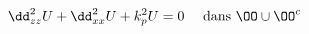 \begin{equation}
\dd_{\z\z}^2 U + \dd_{\x\x}^2 U + k_p^2 U = 0 \quad \text { dans \(\OO\cup\OO^c\)}
\end{equation}


%
%
%





